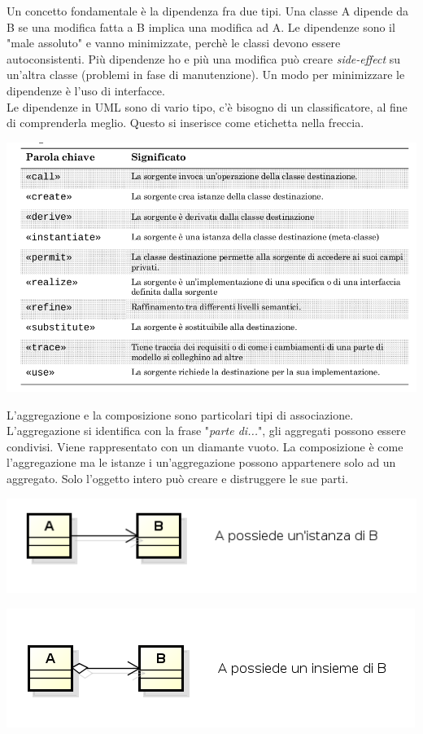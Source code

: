 Un concetto fondamentale è la dipendenza fra due tipi. Una classe A dipende da B se una modifica fatta a B implica una modifica ad A. Le dipendenze sono il "male assoluto" e vanno minimizzate, perchè le classi devono essere autoconsistenti. Più dipendenze ho e più una modifica può creare \textit{side-effect} su un'altra classe (problemi in fase di manutenzione). Un modo per minimizzare le dipendenze è l'uso di interfacce.\\
Le dipendenze in UML sono di vario tipo, c'è bisogno di un classificatore, al fine di comprenderla meglio. Questo si inserisce come etichetta nella freccia.

\begin{center}

\includegraphics[width=0.75\columnwidth]{img10} %

\end{center}

L'aggregazione e la composizione sono particolari tipi di associazione. L'aggregazione si identifica con la frase "\textit{parte di...}", gli aggregati possono essere condivisi. Viene rappresentato con un diamante vuoto. La composizione è come l'aggregazione ma le istanze i un'aggregazione possono appartenere solo ad un aggregato. Solo l'oggetto intero può creare e distruggere le sue parti.

\begin{center}

\includegraphics[width=0.75\columnwidth]{img11} %

\end{center}

\begin{center}

\includegraphics[width=0.75\columnwidth]{img12} %

\end{center}


